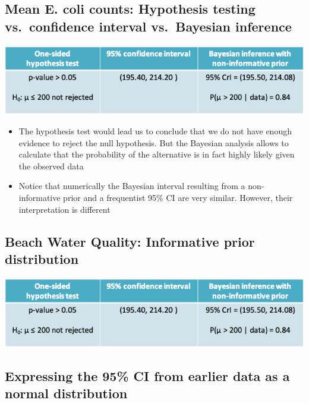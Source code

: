 \documentclass[
]{book}
\providecommand{\tightlist}{%
  \setlength{\itemsep}{0pt}\setlength{\parskip}{0pt}}
\begin{document}
\hypertarget{mean-e.-coli-counts-hypothesis-testing-vs.-confidence-interval-vs.-bayesian-inference}{%
\subsection{Mean E. coli counts: Hypothesis testing vs.~confidence interval vs.~Bayesian inference}\label{mean-e.-coli-counts-hypothesis-testing-vs.-confidence-interval-vs.-bayesian-inference}}

\includegraphics[width=1\linewidth]{./6_28}

\begin{itemize}
\tightlist
\item
  The hypothesis test would lead us to conclude that we do not have enough evidence to reject the null hypothesis. But the Bayesian analysis allows to calculate that the probability of the alternative is in fact highly likely given the observed data
\item
  Notice that numerically the Bayesian interval resulting from a non-informative prior and a frequentist 95\% CI are very similar. However, their interpretation is different
\end{itemize}

\hypertarget{beach-water-quality-informative-prior-distribution}{%
\subsection{Beach Water Quality: Informative prior distribution}\label{beach-water-quality-informative-prior-distribution}}

\includegraphics[width=1\linewidth]{./6_28}

\hypertarget{expressing-the-95-ci-from-earlier-data-as-a-normal-distribution}{%
\subsection{Expressing the 95\% CI from earlier data as a normal distribution}\label{expressing-the-95-ci-from-earlier-data-as-a-normal-distribution}}
\end{document}
